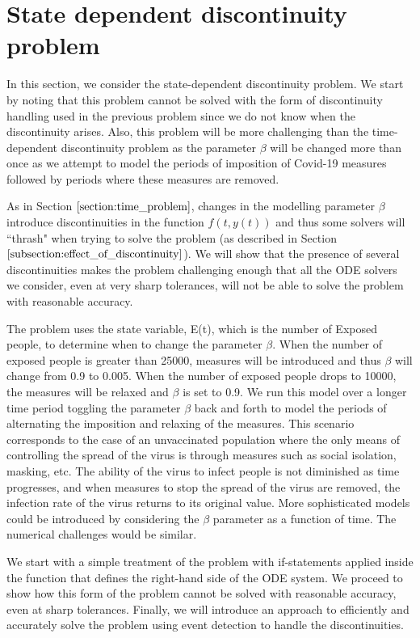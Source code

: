 
\section{State dependent discontinuity problem}
In this section, we consider the state-dependent discontinuity problem. We start by noting that this problem cannot be solved with the form of discontinuity handling used in the previous problem since we do not know when the discontinuity arises. Also, this problem will be more challenging than the time-dependent discontinuity problem as the parameter $\beta$ will be changed more than once as we attempt to model the periods of imposition of Covid-19 measures followed by periods where these measures are removed. 

As in Section $\ref{section:time_problem}$, changes in the modelling parameter $\beta$ introduce discontinuities in the function $f(t, y(t))$ and thus some solvers will ``thrash" when trying to solve the problem (as described in Section $\ref{subsection:effect_of_discontinuity}$). We will show that the presence of several discontinuities makes the problem challenging enough that all the ODE solvers we consider, even at very sharp tolerances, will not be able to solve the problem with reasonable accuracy.

The problem uses the state variable, E(t), which is the number of Exposed people, to determine when to change the parameter $\beta$. When the number of exposed people is greater than 25000, measures will be introduced and thus $\beta$ will change from 0.9 to 0.005. When the number of exposed people drops to 10000, the measures will be relaxed and $\beta$ is set to 0.9. We run this model over a longer time period toggling the parameter $\beta$ back and forth to model the periods of alternating the imposition and relaxing of the measures. This scenario corresponds to the case of an unvaccinated population where the only means of controlling the spread of the virus is through measures such as social isolation, masking, etc. The ability of the virus to infect people is not diminished as time progresses, and when measures to stop the spread of the virus are removed, the infection rate of the virus returns to its original value. More sophisticated models could be introduced by considering the $\beta$ parameter as a function of time. The numerical challenges would be similar.

We start with a simple treatment of the problem with if-statements applied inside the function that defines the right-hand side of the ODE system. We proceed to show how this form of the problem cannot be solved with reasonable accuracy, even at sharp tolerances. Finally, we will introduce an approach to efficiently and accurately solve the problem using event detection to handle the discontinuities.

